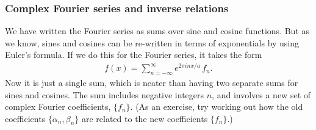 \documentclass[10pt,a4paper]{article}
\begin{document}
\subsubsection{Complex Fourier series and inverse relations}
\label{complex-fourier-series-and-inverse-relations}

We have written the Fourier series as sums over sine and cosine
functions. But as we know, sines and cosines can be re-written in
terms of exponentials by using Euler's formula. If we do this for the
Fourier series, it takes the form
\begin{align}
  f(x) = \sum_{n=-\infty}^\infty e^{2\pi i n x/a}\, f_n.
\end{align}
Now it is just a single sum, which is neater than having two separate
sums for sines and cosines. The sum includes negative integers $n$,
and involves a new set of complex Fourier coefficients, $\{f_n\}$. (As
an exercise, try working out how the old coefficients $\{\alpha_n,
\beta_n\}$ are related to the new coefficients $\{f_n\}$.)
\end{document}
